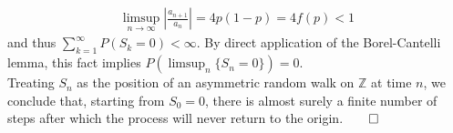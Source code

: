 \documentclass[10pt]{article}
\newcommand{\mbb}[1]{\mathbb{#1}}
\newcommand{\1}[1]{\mathbbm{1}_{#1}}
\begin{document}
    \begin{align*}
        \limsup_{n\rightarrow\infty}\left|\frac{a_{n+1}}{a_n}\right|=4p(1-p)=4f(p)<1
    \end{align*}
    and thus $\sum_{k=1}^\infty P(S_k=0)<\infty$. By direct application of the Borel-Cantelli lemma, this fact implies $P(\limsup_n\{S_n=0\})=0$. \\[5pt]
    Treating $S_n$ as the position of an asymmetric random walk on $\mbb{Z}$ at time $n$, we conclude that, starting from $S_0=0$, there is almost surely
    a finite number of steps after which the process will never return to the origin.\hfill{$\qed$}\\[5pt]
\end{document}
